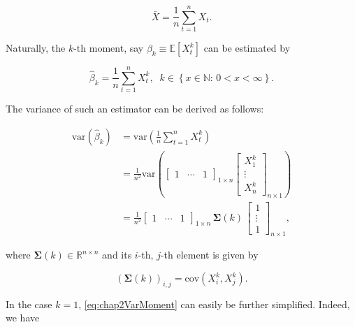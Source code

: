 \documentclass[]{book}
\theoremstyle{definition}
\theoremstyle{definition}
\theoremstyle{definition}
\theoremstyle{remark}
\begin{document}
\[\bar{X} = {\frac{1}{n}\sum\limits_{t = 1}^n {{X_t}} }.\]

Naturally, the \(k\)-th moment, say \(\beta_k \equiv \mathbb{E}[X_t^k]\)
can be estimated by

\[\hat{\beta}_k = {\frac{1}{n}\sum\limits_{t = 1}^n {{X_t^k}} }, \;\; k \in \left\{x \in \mathbb{N} : \, 0 < x < \infty  \right\}.\]

The variance of such an estimator can be derived as follows:

\begin{equation}
  \begin{aligned}
  \text{var} \left( \hat{\beta}_k \right) &= \text{var} \left( {\frac{1}{n}\sum\limits_{t = 1}^n {{X_t^k}} } \right)  \\
  &= \frac{1}{{{n^2}}}\text{var} \left( {{{\left[ {\begin{array}{*{20}{c}}
    1& \cdots &1
    \end{array}} \right]}_{1 \times n}}{{\left[ {\begin{array}{*{20}{c}}
      {{X_1^k}} \\
      \vdots  \\
      {{X_n^k}}
      \end{array}} \right]}_{n \times 1}}} \right)  \\
  &= \frac{1}{{{n^2}}}{\left[ {\begin{array}{*{20}{c}}
    1& \cdots &1
    \end{array}} \right]_{1 \times n}} \, \boldsymbol{\Sigma}(k) \, {\left[ {\begin{array}{*{20}{c}}
      1 \\
      \vdots  \\
      1
      \end{array}} \right]_{n \times 1}}, 
  \end{aligned}
  \label{eq:chap2VarMoment}
\end{equation}

where \(\boldsymbol{\Sigma}(k) \in \mathbb{R}^{n \times n}\) and its
\(i\)-th, \(j\)-th element is given by

\[ \left(\boldsymbol{\Sigma}(k)\right)_{i,j} = \text{cov} \left(X_i^k, X_j^k\right).\]

In the case \(k = 1\), \eqref{eq:chap2VarMoment} can easily be further
simplified. Indeed, we have
\end{document}
